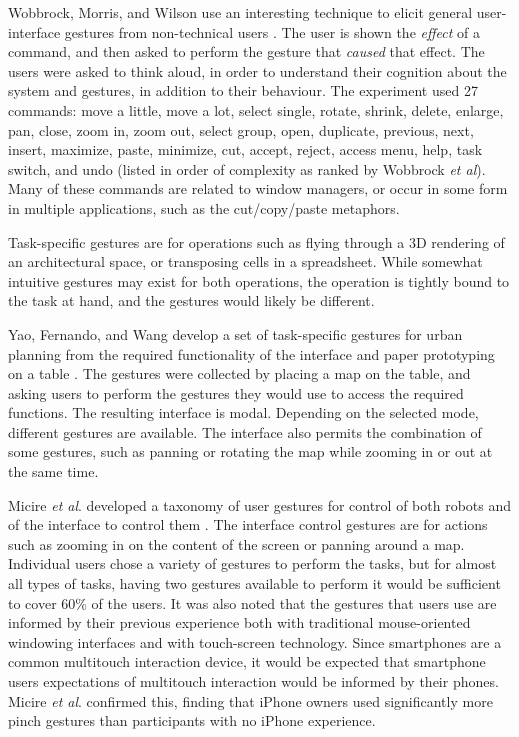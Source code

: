 Wobbrock, Morris, and Wilson use an interesting technique to elicit general user-interface gestures from non-technical users \citep{wobbrock2009user}.
The user is shown the \textit{effect} of a command, and then asked to perform the gesture that \textit{caused} that effect. 
The users were asked to think aloud, in order to understand their cognition about the system and gestures, in addition to their behaviour. 
The experiment used 27 commands: move a little, move a lot, select single, rotate, shrink, delete, enlarge, pan, close, zoom in, zoom out, select group, open, duplicate, previous, next, insert, maximize, paste, minimize, cut, accept, reject, access menu, help, task switch, and undo (listed in order of complexity as ranked by Wobbrock \textit{et al}).
Many of these commands are related to window managers, or occur in some form in multiple applications, such as the cut/copy/paste metaphors.

Task-specific gestures are for operations such as flying through a 3D rendering of an architectural space, or transposing cells in a spreadsheet. 
While somewhat intuitive gestures may exist for both operations, the operation is tightly bound to the task at hand, and the gestures would likely be different. 

Yao, Fernando, and Wang develop a set of task-specific gestures for urban planning from the required functionality of the interface and paper prototyping on a table \citep{yao2012multi}. 
The gestures were collected by placing a map on the table, and asking users to perform the gestures they would use to access the required functions. 
The resulting interface is modal.
Depending on the selected mode, different gestures are available. 
The interface also permits the combination of some gestures, such as panning or rotating the map while zooming in or out at the same time. 

Micire \textit{et al}. developed a taxonomy of user gestures for control of both robots and of the interface to control them \citep{Micire:2009:ANG:1731903.1731912}. 
The interface control gestures are for actions such as zooming in on the content of the screen or panning around a map. 
Individual users chose a variety of gestures to perform the tasks, but for almost all types of tasks, having two gestures available to perform it would be sufficient to cover 60\% of the users. 
It was also noted that the gestures that users use are informed by their previous experience both with traditional mouse-oriented windowing interfaces and with touch-screen technology. 
Since smartphones are a common multitouch interaction device, it would be expected that smartphone users expectations of multitouch interaction would be informed by their phones. 
Micire \textit{et al}. confirmed this, finding that iPhone owners used significantly more pinch gestures than participants with no iPhone experience. 

